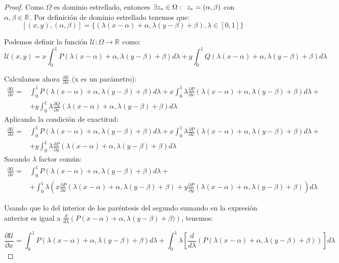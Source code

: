 \documentclass[12pt]{article}
\newcommand{\R}[1][]{\mathbb{R}^{#1}}
\newcommand{\U}{\mathcal{U}}
\newtheorem{proof}{Demostración:}
\begin{document}
\begin{proof}
Como $\Omega$ es dominio estrellado, entonces $\exists z_*\in\Omega:\enskip z_*=(\alpha, \beta)$ con $\alpha,\beta \in \R$. Por definición de dominio estrellado tenemos que:
\[
[(x,y),(\alpha, \beta)]=\{(\lambda(x-\alpha)+\alpha,\lambda(y-\beta)+\beta),\lambda\in[0,1]\}
\]

Podemos definir la función $\U: \Omega	\longrightarrow \R$ como:
\[
\U(x,y)=x\int_0^1P(\lambda(x-\alpha)+\alpha,\lambda(y-\beta)+\beta)d\lambda+y\int_0^1Q(\lambda(x-\alpha)+\alpha,\lambda(y-\beta)+\beta)d\lambda
\]

Calculamos ahora $\displaystyle\frac{\partial \U}{\partial x}$ (x es un parámetro):
\begin{align*}
\frac{\partial \U}{\partial x}=& \int_0^1 P(\lambda(x-\alpha)+\alpha,\lambda(y-\beta)+\beta)d\lambda+x\int_0^1\lambda\frac{\partial P}{\partial x}(\lambda(x-\alpha)+\alpha,\lambda(y-\beta)+\beta)d\lambda+ \\
& +y\int_0^1\lambda\frac{\partial Q}{\partial x}(\lambda(x-\alpha)+\alpha,\lambda(y-\beta)+\beta)d\lambda
\end{align*}
Aplicando la condición de exactitud:
\begin{align*}
\frac{\partial \U}{\partial x}=& \int_0^1 P(\lambda(x-\alpha)+\alpha,\lambda(y-\beta)+\beta)d\lambda+x\int_0^1\lambda\frac{\partial P}{\partial x}(\lambda(x-\alpha)+\alpha,\lambda(y-\beta)+\beta)d\lambda+ \\
& +y\int_0^1\lambda\frac{\partial P}{\partial y}(\lambda(x-\alpha)+\alpha,\lambda(y-\beta)+\beta)d\lambda
\end{align*}
Sacando $\lambda$ factor común:
\begin{align*}
\frac{\partial \U}{\partial x}=& \int_0^1 P(\lambda(x-\alpha)+\alpha,\lambda(y-\beta)+\beta)d\lambda+\\
& +\int_0^1\lambda \left(x\frac{\partial P}{\partial x}(\lambda(x-\alpha)+\alpha,\lambda(y-\beta)+\beta)+y\frac{\partial P}{\partial y}(\lambda(x-\alpha)+\alpha,\lambda(y-\beta)+\beta)\right)d\lambda
\end{align*}

Usando que lo del interior de los paréntesis del segundo sumando en la expresión anterior es igual a $\displaystyle\frac{d}{d\lambda}\left(P(x-\alpha)+\alpha,\lambda(y-\beta)+\beta)\right)$, tenemos:

\[
\frac{\partial \U}{\partial x}=\int_0^1 P(\lambda(x-\alpha)+\alpha,\lambda(y-\beta)+\beta)d\lambda+\int_0^1\lambda \left[\displaystyle\frac{d}{d\lambda}\left(P(\lambda(x-\alpha)+\alpha,\lambda(y-\beta)+\beta)\right)\right]d\lambda	
\]


\end{proof}
\end{document}
